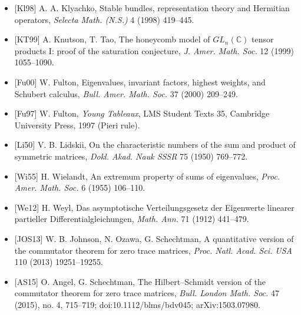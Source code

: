 \documentclass[
  11pt,
  a4paper,
]{article}
\begin{document}
\begin{itemize}
\item
  {[}Kl98{]} A. A. Klyachko, Stable bundles, representation theory and
  Hermitian operators, \emph{Selecta Math. (N.S.)} 4 (1998) 419--445.
\item
  {[}KT99{]} A. Knutson, T. Tao, The honeycomb model of
  \(GL_n(\mathbb C)\) tensor products I: proof of the saturation
  conjecture, \emph{J. Amer. Math. Soc.} 12 (1999) 1055--1090.
\item
  {[}Fu00{]} W. Fulton, Eigenvalues, invariant factors, highest weights,
  and Schubert calculus, \emph{Bull. Amer. Math. Soc.} 37 (2000)
  209--249.
\item
  {[}Fu97{]} W. Fulton, \emph{Young Tableaux}, LMS Student Texts 35,
  Cambridge University Press, 1997 (Pieri rule).
\item
  {[}Li50{]} V. B. Lidskii, On the characteristic numbers of the sum and
  product of symmetric matrices, \emph{Dokl. Akad. Nauk SSSR} 75 (1950)
  769--772.
\item
  {[}Wi55{]} H. Wielandt, An extremum property of sums of eigenvalues,
  \emph{Proc. Amer. Math. Soc.} 6 (1955) 106--110.
\item
  {[}We12{]} H. Weyl, Das asymptotische Verteilungsgesetz der Eigenwerte
  linearer partieller Differentialgleichungen, \emph{Math. Ann.} 71
  (1912) 441--479.
\item
  {[}JOS13{]} W. B. Johnson, N. Ozawa, G. Schechtman, A quantitative
  version of the commutator theorem for zero trace matrices, \emph{Proc.
  Natl. Acad. Sci. USA} 110 (2013) 19251--19255.
\item
  {[}AS15{]} O. Angel, G. Schechtman, The Hilbert--Schmidt version of
  the commutator theorem for zero trace matrices, \emph{Bull. London
  Math. Soc.} 47 (2015), no. 4, 715--719; doi:10.1112/blms/bdv045;
  arXiv:1503.07980.
\end{itemize}
\end{document}
